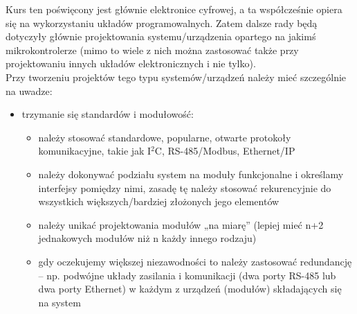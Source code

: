 Kurs ten poświęcony jest głównie elektronice cyfrowej, a ta współcześnie opiera się na wykorzystaniu układów programowalnych.
Zatem dalsze rady będą dotyczyły głównie projektowania systemu/urządzenia opartego na jakimś mikrokontrolerze
(mimo to wiele z nich można zastosować także przy projektowaniu innych układów elektronicznych i nie tylko).
\\
Przy tworzeniu projektów tego typu systemów/urządzeń należy mieć szczególnie na uwadze:
\begin{itemize}
	\item trzymanie się standardów i modułowość:
		\begin{itemize}
			\item należy stosować standardowe, popularne, otwarte protokoły komunikacyjne, takie jak I$^2$C, RS-485/Modbus, Ethernet/IP
			\item należy dokonywać podziału system na moduły funkcjonalne i określamy interfejsy pomiędzy nimi, zasadę tę należy stosować rekurencyjnie do wszystkich większych/bardziej złożonych jego elementów
			\item należy unikać projektowania modułów „na miarę” (lepiej mieć n+2 jednakowych modułów niż n każdy innego rodzaju)
			\item gdy oczekujemy większej niezawodności to należy zastosować redundancję – np. podwójne układy zasilania i komunikacji (dwa porty RS-485 lub dwa porty Ethernet) w każdym z urządzeń (modułów) składających się na system
			

\end{itemize}
\end{itemize}
